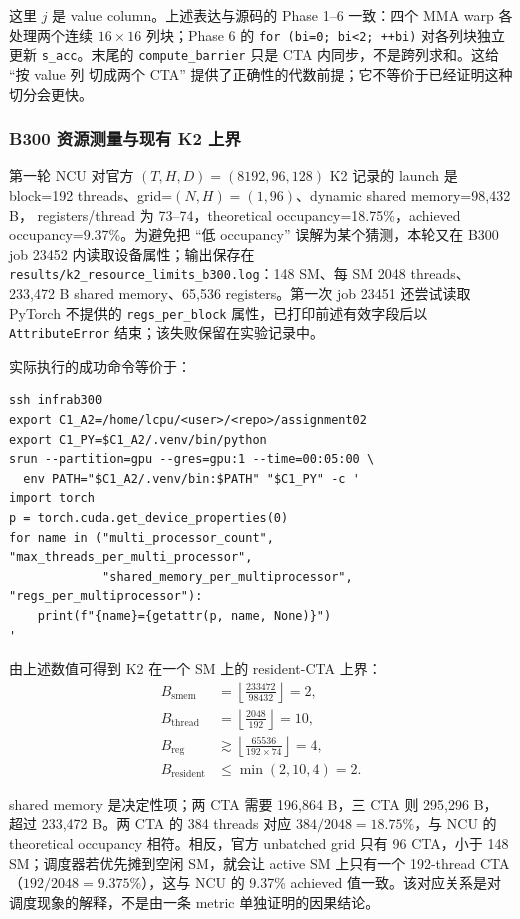 \documentclass[11pt,a4paper,fontset=none]{ctexart}
\newcommand{\code}[1]{\texttt{#1}}
\begin{document}
这里 \(j\) 是 value column。上述表达与源码的 Phase 1--6 一致：四个 MMA
warp 各处理两个连续 \(16\times16\) 列块；Phase 6 的
\code{for (bi=0; bi<2; ++bi)} 对各列块独立更新 \code{s\_acc}。末尾的
\code{compute\_barrier} 只是 CTA 内同步，不是跨列求和。这给 ``按 value 列
切成两个 CTA'' 提供了正确性的代数前提；它不等价于已经证明这种切分会更快。

\subsubsection{B300 资源测量与现有 K2 上界}

第一轮 NCU 对官方 \((T,H,D)=(8192,96,128)\) K2 记录的 launch 是
block=192 threads、grid=\((N,H)=(1,96)\)、dynamic shared memory=98,432 B，
registers/thread 为 73--74，theoretical occupancy=18.75\%，achieved
occupancy=9.37\%。为避免把 ``低 occupancy'' 误解为某个猜测，本轮又在 B300
job 23452 内读取设备属性；输出保存在
\code{results/k2\_resource\_limits\_b300.log}：148 SM、每 SM 2048 threads、
233,472 B shared memory、65,536 registers。第一次 job 23451 还尝试读取
PyTorch 不提供的 \code{regs\_per\_block} 属性，已打印前述有效字段后以
\code{AttributeError} 结束；该失败保留在实验记录中。

实际执行的成功命令等价于：

\begin{lstlisting}
ssh infrab300
export C1_A2=/home/lcpu/<user>/<repo>/assignment02
export C1_PY=$C1_A2/.venv/bin/python
srun --partition=gpu --gres=gpu:1 --time=00:05:00 \
  env PATH="$C1_A2/.venv/bin:$PATH" "$C1_PY" -c '
import torch
p = torch.cuda.get_device_properties(0)
for name in ("multi_processor_count", "max_threads_per_multi_processor",
             "shared_memory_per_multiprocessor", "regs_per_multiprocessor"):
    print(f"{name}={getattr(p, name, None)}")
'
\end{lstlisting}

由上述数值可得到 K2 在一个 SM 上的 resident-CTA 上界：
\[
\begin{aligned}
B_{\mathrm{smem}} &= \left\lfloor\frac{233472}{98432}\right\rfloor=2,\\
B_{\mathrm{thread}} &= \left\lfloor\frac{2048}{192}\right\rfloor=10,\\
B_{\mathrm{reg}} &\mathrel{\gtrsim}\left\lfloor\frac{65536}{192\times74}\right\rfloor=4,\\
B_{\mathrm{resident}} &\leq \min(2,10,4)=2.
\end{aligned}
\]

shared memory 是决定性项；两 CTA 需要 196,864 B，三 CTA 则 295,296 B，
超过 233,472 B。两 CTA 的 384 threads 对应
\(384/2048=18.75\%\)，与 NCU 的 theoretical occupancy 相符。相反，官方
unbatched grid 只有 96 CTA，小于 148 SM；调度器若优先摊到空闲 SM，就会让
active SM 上只有一个 192-thread CTA（\(192/2048=9.375\%\)），这与 NCU 的
9.37\% achieved 值一致。该对应关系是对调度现象的解释，不是由一条 metric
单独证明的因果结论。
\end{document}
